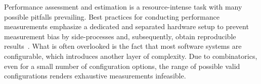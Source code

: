 \documentclass[sigconf]{acmart}
\begin{document}
	Performance assessment and estimation is a resource-intense task with many possible pitfalls prevailing.
	Best practices for conducting performance measurements emphasize a dedicated and separated hardware setup to prevent measurement bias by side-processes and, subsequently, obtain reproducible results~\cite{molyneauxArtApplicationPerformance2015}.	%
	What is often overlooked is the fact that most software systems are configurable, which introduces another layer of complexity.
	Due to combinatorics, even for a small number of configuration options, the range of possible valid configurations renders exhaustive measurements infeasible.
	
	
\end{document}
